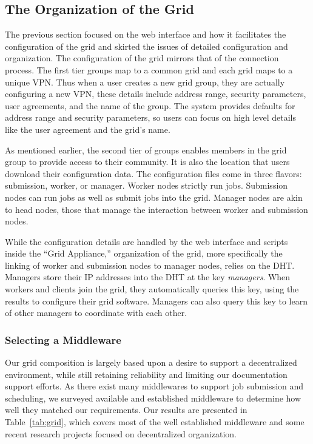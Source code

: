 \documentclass[conference]{IEEEtran}
\begin{document}
\subsection{The Organization of the Grid}

The previous section focused on the web interface and how it facilitates the
configuration of the grid and skirted the issues of detailed configuration and
organization.  The configuration of the grid mirrors that of the connection
process.  The first tier groups map to a common grid and each grid maps to a
unique VPN.  Thus when a user creates a new grid group, they are actually
configuring a new VPN, these details include address range, security
parameters, user agreements, and the name of the group.  The system provides
defaults for address range and security parameters, so users can focus on high
level details like the user agreement and the grid's name.

As mentioned earlier, the second tier of groups enables members in the grid
group to provide access to their community.  It is also the location that users
download their configuration data.  The configuration files come in three
flavors: submission, worker, or manager.  Worker nodes strictly run jobs.
Submission nodes can run jobs as well as submit jobs into the grid.  Manager
nodes are akin to head nodes, those that manage the interaction between worker
and submission nodes.

While the configuration details are handled by the web interface and scripts
inside the ``Grid Appliance,'' organization of the grid, more specifically the
linking of worker and submission nodes to manager nodes, relies on the DHT.
Managers store their IP addresses into the DHT at the key \emph{managers}.
When workers and clients join the grid, they automatically queries this key,
using the results to configure their grid software.  Managers can also query
this key to learn of other managers to coordinate with each other.

\subsubsection{Selecting a Middleware}

Our grid composition is largely based upon a desire to support a decentralized
environment, while still retaining reliability and limiting our documentation
support efforts.  As there exist many middlewares to support job submission and
scheduling, we surveyed available and established middleware to determine how
well they matched our requirements.  Our results are presented in
Table~\ref{tab:grid}, which covers most of the well established middleware and
some recent research projects focused on decentralized organization.
\end{document}
